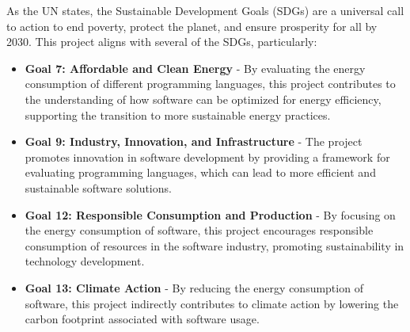 As the UN states, the Sustainable Development Goals (SDGs) \cite{sdg-un} are a universal call to action to end poverty, protect the planet, and ensure prosperity for all by 2030. This project aligns with several of the SDGs, particularly:
\begin{itemize}
    \item \textbf{Goal 7: Affordable and Clean Energy} - By evaluating the energy consumption of different programming languages, this project contributes to the understanding of how software can be optimized for energy efficiency, supporting the transition to more sustainable energy practices.
    \item \textbf{Goal 9: Industry, Innovation, and Infrastructure} - The project promotes innovation in software development by providing a framework for evaluating programming languages, which can lead to more efficient and sustainable software solutions.
    \item \textbf{Goal 12: Responsible Consumption and Production} - By focusing on the energy consumption of software, this project encourages responsible consumption of resources in the software industry, promoting sustainability in technology development.
    \item \textbf{Goal 13: Climate Action} - By reducing the energy consumption of software, this project indirectly contributes to climate action by lowering the carbon footprint associated with software usage.
\end{itemize}